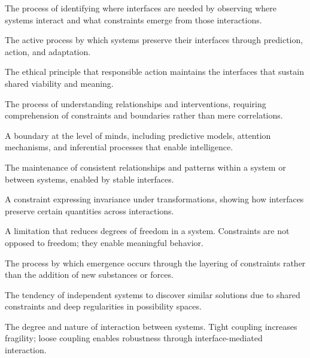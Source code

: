 \documentclass[
  openright]{book}
\renewenvironment{description}
  {\list{}{\labelwidth 0pt \itemindent-\leftmargin \leftmargin 2.5em
          \itemsep 0.4\baselineskip
          \parsep 0pt
          \let\makelabel\descriptionlabel}}
  {\endlist}
\newcommand*\descriptionlabel[1]{\hspace\labelsep\normalfont\bfseries #1}
\begin{document}
\begin{description}
\item[Boundary Discovery] The process of identifying where interfaces are needed by observing where systems interact and what constraints emerge from those interactions.

\item[Boundary Maintenance] The active process by which systems preserve their interfaces through prediction, action, and adaptation.

\item[Boundary Preservation] The ethical principle that responsible action maintains the interfaces that sustain shared viability and meaning.

\item[Causal Inference] The process of understanding relationships and interventions, requiring comprehension of constraints and boundaries rather than mere correlations.

\item[Cognitive Interface] A boundary at the level of minds, including predictive models, attention mechanisms, and inferential processes that enable intelligence.

\item[Coherence] The maintenance of consistent relationships and patterns within a system or between systems, enabled by stable interfaces.

\item[Conservation Law] A constraint expressing invariance under transformations, showing how interfaces preserve certain quantities across interactions.

\item[Constraint] A limitation that reduces degrees of freedom in a system. Constraints are not opposed to freedom; they enable meaningful behavior.

\item[Constraint Accumulation] The process by which emergence occurs through the layering of constraints rather than the addition of new substances or forces.

\item[Convergence] The tendency of independent systems to discover similar solutions due to shared constraints and deep regularities in possibility spaces.

\item[Coupling] The degree and nature of interaction between systems. Tight coupling increases fragility; loose coupling enables robustness through interface-mediated interaction.


\end{description}
\end{document}
